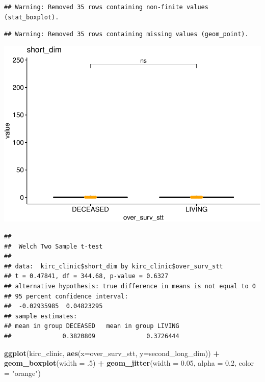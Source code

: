 \documentclass[]{article}
\newenvironment{Shaded}{\begin{snugshade}}{\end{snugshade}}
\newcommand{\KeywordTok}[1]{\textcolor[rgb]{0.13,0.29,0.53}{\textbf{#1}}}
\newcommand{\DataTypeTok}[1]{\textcolor[rgb]{0.13,0.29,0.53}{#1}}
\newcommand{\DecValTok}[1]{\textcolor[rgb]{0.00,0.00,0.81}{#1}}
\newcommand{\FloatTok}[1]{\textcolor[rgb]{0.00,0.00,0.81}{#1}}
\newcommand{\StringTok}[1]{\textcolor[rgb]{0.31,0.60,0.02}{#1}}
\newcommand{\OperatorTok}[1]{\textcolor[rgb]{0.81,0.36,0.00}{\textbf{#1}}}
\newcommand{\NormalTok}[1]{#1}
\begin{document}
\begin{verbatim}
## Warning: Removed 35 rows containing non-finite values (stat_boxplot).
\end{verbatim}

\begin{verbatim}
## Warning: Removed 35 rows containing missing values (geom_point).
\end{verbatim}

\includegraphics{figs/render-unnamed-chunk-12-8.pdf}

\begin{Shaded}
\end{Shaded}

\begin{verbatim}
## 
##  Welch Two Sample t-test
## 
## data:  kirc_clinic$short_dim by kirc_clinic$over_surv_stt
## t = 0.47841, df = 344.68, p-value = 0.6327
## alternative hypothesis: true difference in means is not equal to 0
## 95 percent confidence interval:
##  -0.02935985  0.04823295
## sample estimates:
## mean in group DECEASED   mean in group LIVING 
##              0.3820809              0.3726444
\end{verbatim}

\begin{Shaded}
\begin{Highlighting}[]
\KeywordTok{ggplot}\NormalTok{(kirc_clinic, }\KeywordTok{aes}\NormalTok{(}\DataTypeTok{x=}\NormalTok{over_surv_stt, }\DataTypeTok{y=}\NormalTok{second_long_dim)) }\OperatorTok{+}
\StringTok{  }\KeywordTok{geom_boxplot}\NormalTok{(}\DataTypeTok{width =}\NormalTok{ .}\DecValTok{5}\NormalTok{) }\OperatorTok{+}
\StringTok{  }\KeywordTok{geom_jitter}\NormalTok{(}\DataTypeTok{width =} \FloatTok{0.05}\NormalTok{, }\DataTypeTok{alpha =} \FloatTok{0.2}\NormalTok{, }\DataTypeTok{color =} \StringTok{"orange"}\NormalTok{)}
\end{Highlighting}
\end{Shaded}
\end{document}
